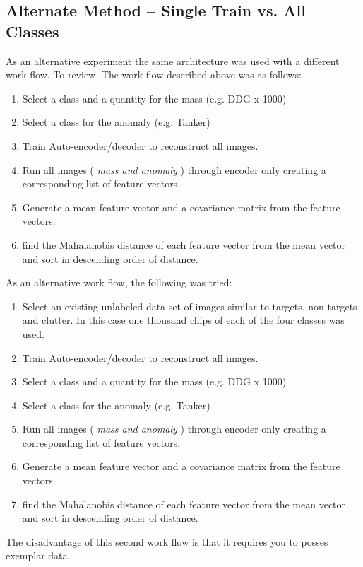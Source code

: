 \documentclass{article}
\begin{document}
\subsection{Alternate Method -- Single Train vs. All Classes}

As an alternative experiment the same architecture was used with a different work flow.
To review. The work flow described above was as follows:
\begin{enumerate}
\item Select a class and a quantity for the mass (e.g. DDG x 1000)
\item Select a class for the anomaly (e.g. Tanker)
\item Train Auto-encoder/decoder to reconstruct all images.
\item Run all images (\textit{ mass and anomaly }) through encoder only creating a corresponding list of feature vectors.
\item Generate a mean feature vector and a covariance matrix from the feature vectors.
  \item find the Mahalanobis distance of each feature vector from the mean vector and sort in descending order of distance.
\end{enumerate}

As an alternative work flow, the following was tried:
\begin{enumerate}
\item Select an existing unlabeled data set of images similar to targets, non-targets and clutter. In this case one thousand chips of each of the four classes was used.
\item Train Auto-encoder/decoder to reconstruct all images.
\item Select a class and a quantity for the mass (e.g. DDG x 1000)
\item Select a class for the anomaly (e.g. Tanker)
\item Run all images (\textit{ mass and anomaly }) through encoder only creating a corresponding list of feature vectors.
\item Generate a mean feature vector and a covariance matrix from the feature vectors.
  \item find the Mahalanobis distance of each feature vector from the mean vector and sort in descending order of distance.
\end{enumerate}

The disadvantage of this second work flow is that it requires you to posses exemplar data.
\end{document}
